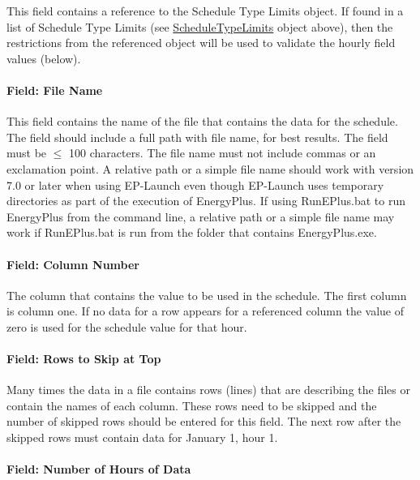 This field contains a reference to the Schedule Type Limits object. If found in a list of Schedule Type Limits (see \hyperref[scheduletypelimits]{ScheduleTypeLimits} object above), then the restrictions from the referenced object will be used to validate the hourly field values (below).

\paragraph{Field: File Name}\label{schedulefile-field-file-name}

This field contains the name of the file that contains the data for the schedule. The field should include a full path with file name, for best results. The field must be \(\le\) 100 characters. The file name must not include commas or an exclamation point. A relative path or a simple file name should work with version 7.0 or later when using EP-Launch even though EP-Launch uses temporary directories as part of the execution of EnergyPlus. If using RunEPlus.bat to run EnergyPlus from the command line, a relative path or a simple file name may work if RunEPlus.bat is run from the folder that contains EnergyPlus.exe.

\paragraph{Field: Column Number}\label{field-column-number}

The column that contains the value to be used in the schedule. The first column is column one. If no data for a row appears for a referenced column the value of zero is used for the schedule value for that hour.

\paragraph{Field: Rows to Skip at Top}\label{field-rows-to-skip-at-top}

Many times the data in a file contains rows (lines) that are describing the files or contain the names of each column. These rows need to be skipped and the number of skipped rows should be entered for this field. The next row after the skipped rows must contain data for January 1, hour 1.

\paragraph{Field: Number of Hours of Data}\label{field-number-of-hours-of-data}

